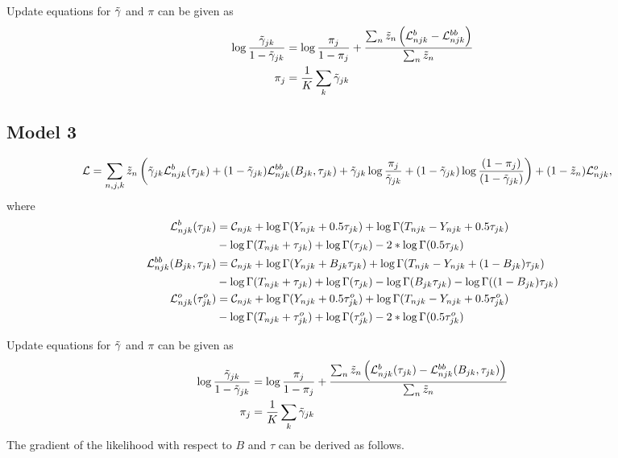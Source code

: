 \documentclass[reqno]{amsart}
\numberwithin{equation}{section}
\begin{document}
Update equations for $\tilde{\gamma}$ and $\pi$ can be given as
\begin{align}
    \log \frac{\tilde{\gamma}_{jk}}{1-\tilde{\gamma}_{jk}}
        &= \log \frac{\pi_j}{1-\pi_j} + \frac{\sum_n \tilde{z}_n \left( \mathcal{L}^b_{njk} - \mathcal{L}^{bb}_{njk} \right)}{\sum_n \tilde{z}_n} \\
    \pi_j
        &= \frac{1}{K} \sum_k \tilde{\gamma}_{jk}
\end{align}

\subsection{Model 3}
\begin{align}
    \mathcal{L}
        &= \sum_{n,j,k} \tilde{z}_n \left( \tilde{\gamma}_{jk} \mathcal{L}^b_{njk}(\tau_{jk}) 
        + (1-\tilde{\gamma}_{jk}) \mathcal{L}^{bb}_{njk}(B_{jk},\tau_{jk})
        + \tilde{\gamma}_{jk} \log \frac{\pi_j}{\tilde{\gamma}_{jk}} + (1-\tilde{\gamma}_{jk}) \log \frac{(1-\pi_j)}{(1-\tilde{\gamma}_{jk})} \right)
        + (1-\tilde{z}_n) \mathcal{L}^o_{njk},
\end{align}
where
\begin{align}
    \mathcal{L}^b_{njk}(\tau_{jk})
        &= \mathcal{C}_{njk} + \log \Gamma(Y_{njk}+0.5\tau_{jk}) + \log \Gamma(T_{njk}-Y_{njk}+0.5\tau_{jk}) \notag\\
        &- \log \Gamma(T_{njk}+\tau_{jk}) + \log \Gamma(\tau_{jk}) - 2*\log \Gamma(0.5\tau_{jk}) \\
    \mathcal{L}^{bb}_{njk}(B_{jk},\tau_{jk})
        &= \mathcal{C}_{njk} + \log \Gamma(Y_{njk}+B_{jk}\tau_{jk}) + \log \Gamma(T_{njk}-Y_{njk}+(1-B_{jk})\tau_{jk}) \notag\\
        &- \log \Gamma(T_{njk}+\tau_{jk}) + \log \Gamma(\tau_{jk}) - \log \Gamma(B_{jk}\tau_{jk}) - \log \Gamma((1-B_{jk})\tau_{jk})\\
    \mathcal{L}^o_{njk}(\tau^o_{jk})
        &= \mathcal{C}_{njk} + \log \Gamma(Y_{njk}+0.5\tau^o_{jk}) + \log \Gamma(T_{njk}-Y_{njk}+0.5\tau^o_{jk}) \notag\\
        &- \log \Gamma(T_{njk}+\tau^o_{jk}) + \log \Gamma(\tau^o_{jk}) - 2*\log \Gamma(0.5\tau^o_{jk})
\end{align}

Update equations for $\tilde{\gamma}$ and $\pi$ can be given as
\begin{align}
    \log \frac{\tilde{\gamma}_{jk}}{1-\tilde{\gamma}_{jk}}
        &= \log \frac{\pi_j}{1-\pi_j} + \frac{\sum_n \tilde{z}_n \left( \mathcal{L}^b_{njk}(\tau_{jk}) 
        - \mathcal{L}^{bb}_{njk}(B_{jk},\tau_{jk}) \right)}{\sum_n \tilde{z}_n} \\
    \pi_j
        &= \frac{1}{K} \sum_k \tilde{\gamma}_{jk}
\end{align}
The gradient of the likelihood with respect to $B$ and $\tau$ can be derived as follows.
\end{document}
